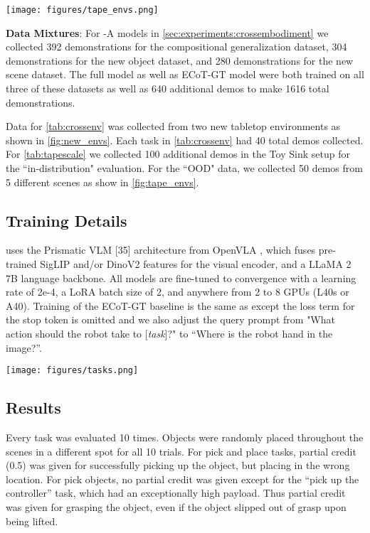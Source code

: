 \begin{figure*}[!ht]
    \centering
    \texttt{[image: figures/tape\_envs.png]}
    \caption{Real world environment data \ACRO is trained with for \cref{sec:experiments:crossenv}.}
    \label{fig:tape_envs}
\end{figure*}


\smallskip \noindent \textbf{Data Mixtures}: For \ACRO-A models in \cref{sec:experiments:crossembodiment} we collected 392 demonstrations for the compositional generalization dataset, 304 demonstrations for the new object dataset, and 280 demonstrations for the new scene dataset. The full \ACRO model as well as ECoT-GT model were both trained on all three of these datasets as well as 640 additional demos to make 1616 total demonstrations.

Data for \cref{tab:crossenv} was collected from two new tabletop environments as shown in \cref{fig:new_envs}. Each task in \cref{tab:crossenv} had 40 total demos collected. For \cref{tab:tapescale} we collected 100 additional demos in the Toy Sink setup for the ``in-distribution" evaluation. For the ``OOD" data, we collected 50 demos from 5 different scenes as show in \cref{fig:tape_envs}. 

\subsection{Training Details}\label{sec:appendix:train}

\ACRO uses the Prismatic VLM [35] architecture from OpenVLA \cite{kim2024openvla}, which fuses pre-trained SigLIP \cite{zhai2023sigmoid} and/or DinoV2 \cite{oquab2023dinov2} features for the visual encoder, and a LLaMA 2 7B \cite{touvron2023llama} language backbone. All models are fine-tuned to convergence with a learning rate of 2e-4, a LoRA batch size of 2, and anywhere from 2 to 8 GPUs (L40s or A40). Training of the ECoT-GT baseline is the same as \ACRO except the loss term for the stop token is omitted and we also adjust the query prompt from "What action should the robot take to [\textit{task}]?" to “Where is the robot hand in the image?”.

\begin{figure*}[!ht]
    \centering
    \texttt{[image: figures/tasks.png]}
    \caption{Example tasks for compositionally new tasks (left), new objects (middle), and new scenes (right).}
    \label{fig:tasks}
\end{figure*}

\subsection{Results}\label{sec:appendix:results}

Every task was evaluated 10 times. Objects were randomly placed throughout the scenes in a different spot for all 10 trials.
For pick and place tasks, partial credit (0.5) was given for successfully picking up the object, but placing in the wrong location. For pick objects, no partial credit was given except for the ``pick up the controller” task, which had an exceptionally high payload. Thus partial credit was given for grasping the object, even if the object slipped out of grasp upon being lifted.

